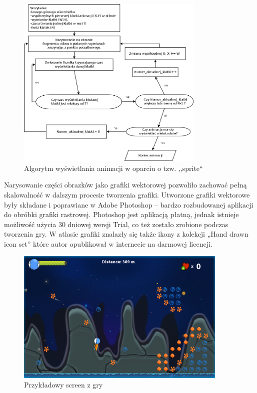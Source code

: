 \begin{figure}[h]
    \centering
    \includegraphics[width=0.8\textwidth,natwidth=510,natheight=142]{./Pictures/sprite_algorytm.png}
    \caption{Algorytm wyświetlania animacji w oparciu o tzw. ,,sprite``}
\end{figure}

Narysowanie części obrazków jako grafiki wektorowej pozwoliło zachować pełną skalowalność w dalszym procesie tworzenia grafiki. Utworzone grafiki
wektorowe były składane i poprawiane w Adobe Photoshop – bardzo rozbudowanej aplikacji do obróbki grafiki rastrowej. Photoshop jest aplikacją płatną,
jednak istnieje możliwość użycia 30 dniowej wersji Trial, co też zostało zrobione podczas tworzenia gry. W atlasie grafiki znalazły się także ikony z
kolekcji „Hand drawn icon set” które autor opublikował w internecie  na darmowej licencji.
\begin{figure}[h]
    \centering
    \includegraphics[width=0.9\textwidth,natwidth=525,natheight=142]{./Pictures/gra2.png}
    \caption{Przykładowy screen z gry}
\end{figure}

